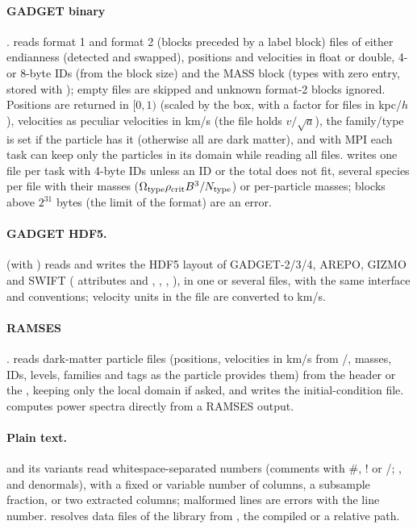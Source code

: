 \paragraph*{GADGET binary} \cite{Springel2005}.  reads format 1 and format 2 (blocks preceded by a label block)
files of either endianness (detected and swapped), positions and velocities in float or double, 4- or 8-byte IDs (from the block
size) and the MASS block (types with zero  entry, stored with ); empty files are skipped and unknown
format-2 blocks ignored. Positions are returned in $[0,1)$ (scaled by the box, with a factor for files in kpc/$h$), velocities as
peculiar velocities in km/s (the file holds $v/\sqrt a$), the family/type is set if the particle has it (otherwise all are dark
matter), and with MPI each task can keep only the particles in its domain while reading all files.  writes one file
per task with 4-byte IDs unless an ID or the total does not fit, several species per file with their  masses
($\Omega_{\rm type}\rho_{\rm crit}B^3/N_{\rm type}$) or per-particle masses; blocks above $2^{31}$ bytes (the limit of the format) are an
error.

\paragraph*{GADGET HDF5.}  (with ) reads and writes the HDF5 layout of GADGET-2/3/4, AREPO,
GIZMO and SWIFT ( attributes and , , , ), in
one or several files, with the same interface and conventions; velocity units in the file are converted to km/s.

\paragraph*{RAMSES} \cite{Teyssier2002}.  reads dark-matter particle files (positions, velocities in km/s from
/, masses, IDs, levels, families and tags as the particle provides them) from the header or the
, keeping only the local domain if asked, and writes the  initial-condition file.
 computes power spectra directly from a RAMSES output.

\paragraph*{Plain text.}  and its variants read whitespace-separated numbers (comments with \#, ! or /; ,
 and denormals), with a fixed or variable number of columns, a subsample fraction, or two extracted columns; malformed lines
are errors with the line number.  resolves data files of the library from , the compiled
 or a relative path.

